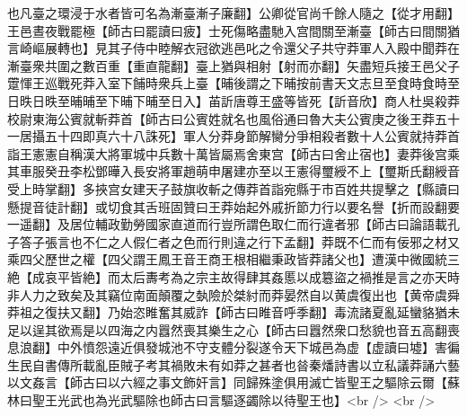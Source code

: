也凡臺之環浸于水者皆可名為漸臺漸子廉翻】公卿從官尚千餘人隨之【從才用翻】王邑晝夜戰罷極【師古曰罷讀曰疲】士死傷略盡馳入宫間關至漸臺【師古曰間關猶言崎嶇展轉也】見其子侍中睦解衣冠欲逃邑叱之令還父子共守莽軍人入殿中聞莽在漸臺衆共圍之數百重【重直龍翻】臺上猶與相射【射而亦翻】矢盡短兵接王邑父子䠠惲王巡戰死莽入室下餔時衆兵上臺【晡後謂之下晡按前書天文志旦至食時食時至日昳日昳至晡晡至下晡下晡至日入】苖訢唐尊王盛等皆死【訢音欣】商人杜吳殺莽校尉東海公賓就斬莽首【師古曰公賓姓就名也風俗通曰魯大夫公賓庚之後王莽五十一居攝五十四即真六十八誅死】軍人分莽身節解臠分爭相殺者數十人公賓就持莽首詣王憲憲自稱漢大將軍城中兵數十萬皆屬焉舍東宫【師古曰舍止宿也】妻莽後宫乘其車服癸丑李松鄧曄入長安將軍趙萌申屠建亦至以王憲得璽綬不上【璽斯氏翻綬音受上時掌翻】多挾宫女建天子鼓旗收斬之傳莽首詣宛縣于市百姓共提擊之【縣讀曰懸提音徒計翻】或切食其舌班固贊曰王莽始起外戚折節力行以要名譽【折而設翻要一遥翻】及居位輔政勤勞國家直道而行豈所謂色取仁而行違者邪【師古曰論語載孔子答子張言也不仁之人假仁者之色而行則違之行下孟翻】莽既不仁而有佞邪之材又乘四父歷世之權【四父謂王鳳王音王商王根相繼秉政皆莽諸父也】遭漢中微國統三絶【成哀平皆絶】而太后夀考為之宗主故得肆其姦慝以成簒盜之禍推是言之亦天時非人力之致矣及其竊位南面顛覆之埶險於桀紂而莽晏然自以黄虞復出也【黄帝虞舜莽祖之復扶又翻】乃始恣睢奮其威詐【師古曰睢音呼季翻】毒流諸夏亂延蠻貉猶未足以逞其欲焉是以四海之内囂然喪其樂生之心【師古曰囂然衆口愁貌也音五高翻喪息浪翻】中外憤怨遠近俱發城池不守支體分裂遂令天下城邑為虚【虚讀曰墟】害徧生民自書傳所載亂臣賊子考其禍敗未有如莽之甚者也㫺秦燔詩書以立私議莽誦六藝以文姦言【師古曰以六經之事文飾奸言】同歸殊塗俱用滅亡皆聖王之驅除云爾【蘇林曰聖王光武也為光武驅除也師古曰言驅逐蠲除以待聖王也】<br />
<br />
